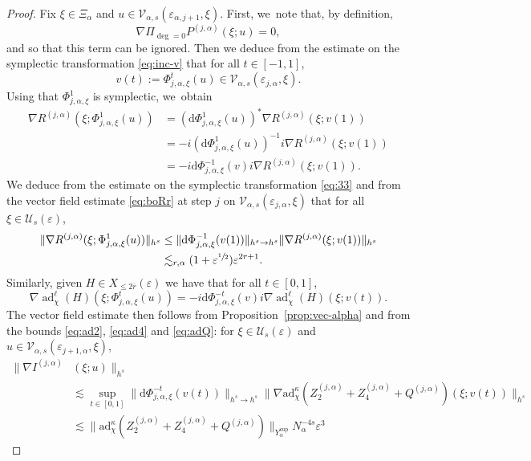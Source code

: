 \documentclass[JEP,XML,SOM,Unicode,published]{cedram}
\theoremstyle{plain}
\theoremstyle{definition}
\newcommand{\1}{\mathbf{1}}
\newcommand{\Ysup}[1]{Y_{#1}^{\mathrm{sup}}}
\let\epsilon\varepsilon
\begin{document}
\begin{proof}
Fix $\xi\in\Xi_{\alpha}$ and $u\in\mathcal{V}_{\alpha,s}(\epsilon_{\alpha,j+1},\xi)$. First, we~note that, by definition,
\[
\nabla \Pi_{\deg=0}P^{(j,\alpha)}(\xi;u)=0,
\]
and so that this term can be ignored. Then we deduce from the estimate on the symplectic transformation \eqref{eq:inc-v} that for all $t\in[-1,1]$,
\[
v(t) := \Phi_{j,\alpha,\xi}^{t}(u)\in\mathcal{V}_{\alpha,s}(\epsilon_{j,\alpha},\xi).
\]
Using that $\Phi_{j,\alpha,\xi}^{1}$ is symplectic, we~obtain
\begin{align*}
\nabla R^{(j,\alpha)}(\xi;\Phi_{j,\alpha,\xi}^{1}(u))
&= (\mathrm{d}\Phi_{j,\alpha,\xi}^{1}(u))^{\ast}
\nabla R^{(j,\alpha)}(\xi;v(1)) \\
&= -i(\mathrm{d}\Phi_{j,\alpha,\xi}^{1}(u))^{-1}i
\nabla R^{(j,\alpha)}(\xi;v(1)) \\
&= -i\mathrm{d}\Phi_{j,\alpha,\xi}^{-1}(v)i
\nabla R^{(j,\alpha)}(\xi;v(1)).
\end{align*}
We deduce from the estimate on the symplectic transformation \eqref{eq:33} and from the vector field estimate \eqref{eq:boRr} at step $j$ on $\mathcal{V}_{\alpha,s}(\epsilon_{j,\alpha},\xi)$ that for all $\xi\in\mathcal{U}_{s}(\epsilon)$,
\[
\begin{split}
\|\nabla R^{(j,\alpha)}(\xi;
\Phi_{j,\alpha,\xi}^{1}(u))\|_{h^{s}}
&\leq
\|\mathrm{d}\Phi_{j,\alpha,\xi}^{-1}(v(1))\|_{h^{s}\to h^{s}}
\|\nabla R^{(j,\alpha)}(\xi;v(1))\|_{h^{s}} \\
&\lesssim_{r,\alpha} (1+\epsilon^{\sfrac{1}{2}})\epsilon^{2r+1}.
\end{split}
\]
Similarly, given $H\in X_{\leq2\overline{r}}(\epsilon)$ we have that for all $t\in[0,1]$,
\[
\nabla
\operatorname{ad}_{\chi}^{\ell}(H)(\xi;\Phi_{j,\alpha,\xi}^{t}(u))
= -i \mathrm{d}\Phi_{j,\alpha,\xi}^{-t}(v)i\nabla \operatorname{ad}_{\chi}^{\ell}(H)(\xi;v(t)).
\]
The vector field estimate then follows from Proposition~\ref{prop:vec-alpha} and from the bounds \eqref{eq:ad2}, \eqref{eq:ad4} and \eqref{eq:adQ}: for $\xi\in\mathcal{U}_{s}(\epsilon)$ and $u\in\mathcal{V}_{\alpha,s}(\epsilon_{j+1,\alpha},\xi)$,
\begin{align*}
\|\nabla I^{(j,\alpha)}&(\xi;u)\|_{h^{s}}\\
&\lesssim
\sup_{t\in[0,1]}\|\mathrm{d}\Phi_{j,\alpha,\xi}^{-t}(v(t))\|_{h^{s}\to h^{s}}
\|\nabla \mathrm{ad}_{\chi}^{\kappa}
(Z_{2}^{(j,\alpha)}
+Z_{4}^{(j,\alpha)}
+Q^{(j,\alpha)})
(\xi;v(t))\|_{h^{s}}
\\
&\lesssim
\| \mathrm{ad}_{\chi}^{\kappa}
(Z_{2}^{(j,\alpha)}+Z_{4}^{(j,\alpha)}+Q^{(j,\alpha)})
\|_{\Ysup{\alpha}}N_{\alpha}^{-4s}\epsilon^{3}

\end{align*}
\end{proof}
\end{document}
